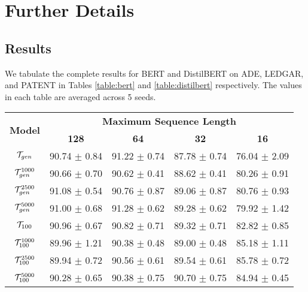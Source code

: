 \section{Further Details}\label{appendix:details}

\subsection{Results}\label{appendix:results}
We tabulate the complete results for BERT and DistilBERT on ADE, LEDGAR, and PATENT in Tables \ref{table:bert} and \ref{table:distilbert} respectively. The values in each table are averaged across 5 seeds.

\begin{table*}[t]
    \begin{subtable}{\textwidth}
    \centering
        \begin{tabular}{ccccc}
            \hline
            
            \multirow{2}{*}{\textbf{Model}}         & \multicolumn{4}{c}{\textbf{Maximum Sequence Length}}  \\          
            
                                                    & \textbf{128}  & \textbf{64}   & \textbf{32}   & \textbf{16}   \\ 
            
            \hline
    
            $\mathcal{T}_{gen}$                               & 90.74 $\pm$ 0.84      & 91.22 $\pm$ 0.74      & 87.78 $\pm$ 0.74      & 76.04 $\pm$ 2.09  \\         
            $\mathcal{T}_{gen}^{1000}$                        & 90.66 $\pm$ 0.70      & 90.62 $\pm$ 0.41      & 88.62 $\pm$ 0.41      & 80.26 $\pm$ 0.91  \\ 
            $\mathcal{T}_{gen}^{2500}$                        & 91.08 $\pm$ 0.54      & 90.76 $\pm$ 0.87      & 89.06 $\pm$ 0.87      & 80.76 $\pm$ 0.93  \\ 
            $\mathcal{T}_{gen}^{5000}$                        & 91.00 $\pm$ 0.68      & 91.28 $\pm$ 0.62      & 89.28 $\pm$ 0.62      & 79.92 $\pm$ 1.42  \\ 
            $\tok100$                               & 90.96 $\pm$ 0.67      & 90.82 $\pm$ 0.71      & 89.32 $\pm$ 0.71      & 82.82 $\pm$ 0.85  \\ 
            $\tok100^{1000}$                        & 89.96 $\pm$ 1.21      & 90.38 $\pm$ 0.48      & 89.00 $\pm$ 0.48      & 85.18 $\pm$ 1.11  \\ 
            $\tok100^{2500}$                        & 89.94 $\pm$ 0.72      & 90.56 $\pm$ 0.61      & 89.54 $\pm$ 0.61      & 85.78 $\pm$ 0.72  \\ 
            $\tok100^{5000}$                        & 90.28 $\pm$ 0.65      & 90.38 $\pm$ 0.75      & 90.70 $\pm$ 0.75      & 84.94 $\pm$ 0.45  \\   
            

\end{tabular}
\end{subtable}
\end{table*}
